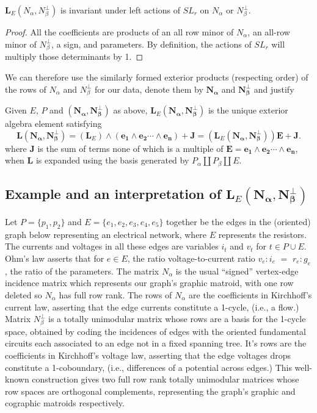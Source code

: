 \documentclass[Unicode]{cedram-alco}
\newcommand{\ext}[1]{\ensuremath{\mathbf{#1}}}
\newcommand{\dunion}{\coprod}
\begin{document}
\begin{prop}
  $\ext{L}_E(N_\alpha,N_\beta^\perp)$ is invariant under left actions of $SL_r$ on $N_\alpha$ or $N_\beta^\perp$.
\end{prop}
\begin{proof}
  All the coefficients are products of an all row minor of $N_\alpha$, an all-row minor of $N_\beta^\perp$, a sign, and
  parameters.
  By definition, the actions of $SL_r$ will multiply those determinants by 1. 
\end{proof}

We can therefore use the similarly formed exterior products
(respecting order) of the rows of $N_\alpha$ and $N_\beta^\perp$
for our data, denote them by 
$\ext{N_\alpha}$ and $\ext{N_\beta^\perp}$
and justify

\begin{defi}
  Given $E$, $P$ and $(\ext{N_\alpha},\ext{N_\beta^\perp})$ as above, $\ext{L}_E(\ext{N_\alpha},\ext{N_\beta^\perp})$ is the
  unique exterior algebra element satisfying
  \[
  \ext{L}(\ext{N_\alpha},\ext{N_\beta^\perp}) =
  (\ext{L}_E)\wedge (\ext{e_1}\wedge\ext{e_2}\cdots\wedge\ext{e_n}) + \ext{J} =
  (\ext{L}_E(\ext{N_\alpha},\ext{N_\beta^\perp}))\ext{E}+\ext{J}.
  \]
  where $\ext{J}$ is the sum of terms none of which is a multiple of $\ext{E}=\ext{e_1}\wedge\ext{e_2}\cdots\wedge\ext{e_n}$, when $\ext{L}$ is expanded using the basis generated by $P_\alpha \dunion P_\beta \dunion E$.
\end{defi}


\subsection{Example and an interpretation of $\ext{L}_E(\ext{N_\alpha},\ext{N_\beta^\perp})$}

Let $P=\{p_1, p_2\}$ and $E=\{e_1, e_2, e_3, e_4, e_5\}$ together be the edges in the (oriented) graph
below representing an electrical network, where $E$ represents the resistors.  The currents and voltages
in all these edges are variables $i_t$ and $v_t$ for $t\in P\cup E$.  Ohm's law
asserts that for $e\in E$, the ratio voltage-to-current ratio
$v_e:i_e$ $=$ $r_e:g_e$, the ratio of the parameters. The matrix $N_\alpha$ is the
usual ``signed'' vertex-edge incidence matrix which represents our graph's graphic matroid, with one
row deleted so $N_\alpha$ has full row rank.  The rows of $N_\alpha$ are the coefficients in
Kirchhoff's current law, asserting that the edge currents constitute a 1-cycle, (i.e., a flow.)
Matrix $N_\beta^\perp$ is a totally unimodular matrix whose
rows are a basis for the 1-cycle space, obtained by coding the incidences of edges with the oriented fundamental
circuits each associated to an edge not in a fixed spanning tree.  It's rows are the coefficients in
Kirchhoff's voltage law, asserting that the edge
voltages drops constitute a 1-coboundary, (i.e., differences
of a potential across edges.)
This well-known construction gives
two full row rank totally unimodular matrices whose row spaces are orthogonal complements,
representing the graph's
graphic and cographic matroids respectively.
\end{document}
